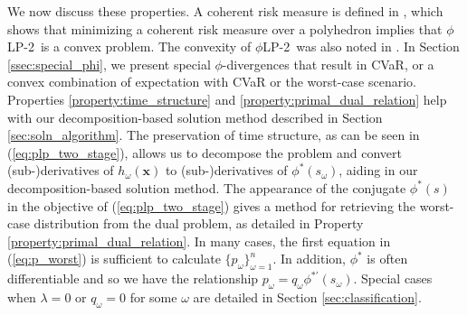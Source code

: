 \documentclass[opre,nonblindrev]{informs3} %
\newcommand{\x}{\mathbf{x}}
\newcommand{\plp}{$\phi$LP-2}
\begin{document}
We now discuss these properties. A coherent risk measure is defined in \citep{rockafellar2007coherent}, which shows that minimizing a coherent risk measure over a polyhedron implies that \plp\ is a convex problem.
The convexity of \plp\ was also noted in \citep{bental2011robust}.
In Section \ref{ssec:special_phi}, we present special $\phi$-divergences that result in CVaR, or a convex combination of expectation with CVaR or the worst-case scenario. 
Properties \ref{property:time_structure} and \ref{property:primal_dual_relation} help with our decomposition-based solution method described in Section \ref{sec:soln_algorithm}. 
The preservation of time structure, as can be seen in (\ref{eq:plp_two_stage}), allows us to decompose the problem and convert (sub-)derivatives of $h_\omega(\x)$ to (sub-)derivatives of $\phi^*\left(s_\omega\right)$, aiding in our decomposition-based solution method. 
The appearance of the conjugate $\phi^*(s)$ in the objective of (\ref{eq:plp_two_stage}) gives a method for retrieving the worst-case distribution from the dual problem, as detailed in Property \ref{property:primal_dual_relation}.
In many cases, the first equation in (\ref{eq:p_worst}) is sufficient to calculate $\{p_\omega\}_{\omega=1}^n$.
In addition, $\phi^*$ is often differentiable and so we have the relationship $p_\omega = q_\omega \phi^{* \prime}(s_\omega)$.
Special cases when $\lambda = 0$ or $q_\omega = 0$ for some $\omega$ are detailed in Section \ref{sec:classification}.

\bigskip 

\bigskip
\end{document}
